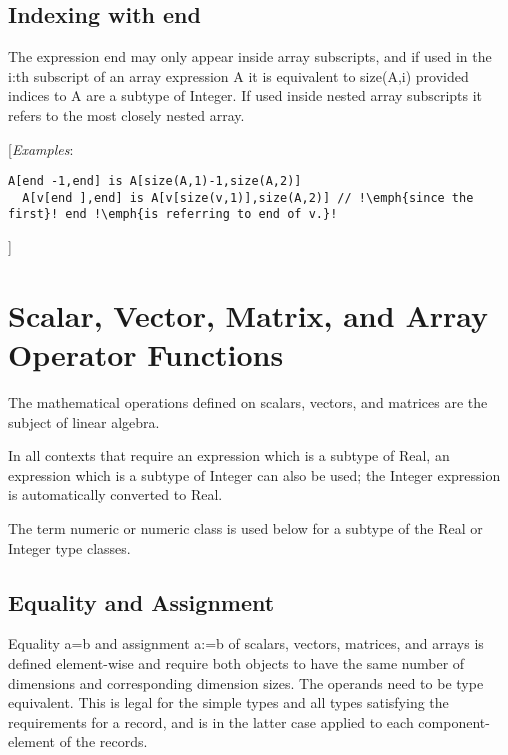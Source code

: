 \subsection{Indexing with end}

The expression end may only appear inside array subscripts, and if used
in the i:th subscript of an array expression A it is equivalent to
size(A,i) provided indices to A are a subtype of Integer. If used inside
nested array subscripts it refers to the most closely nested array.

{[}\emph{Examples}:

\begin{lstlisting}[language=modelica, escapechar=!]
  A[end -1,end] is A[size(A,1)-1,size(A,2)]
  A[v[end ],end] is A[v[size(v,1)],size(A,2)] // !\emph{since the first}! end !\emph{is referring to end of v.}!
\end{lstlisting}
{]}

\section{Scalar, Vector, Matrix, and Array Operator Functions}

The mathematical operations defined on scalars, vectors, and matrices
are the subject of linear algebra.

In all contexts that require an expression which is a subtype of Real,
an expression which is a subtype of Integer can also be used; the
Integer expression is automatically converted to Real.

The term numeric or numeric class is used below for a subtype of the
Real or Integer type classes.

\subsection{Equality and Assignment}

Equality a=b and assignment a:=b of scalars, vectors, matrices, and
arrays is defined element-wise and require both objects to have the same
number of dimensions and corresponding dimension sizes. The operands
need to be type equivalent. This is legal for the simple types and all
types satisfying the requirements for a record, and is in the latter
case applied to each component-element of the records.

